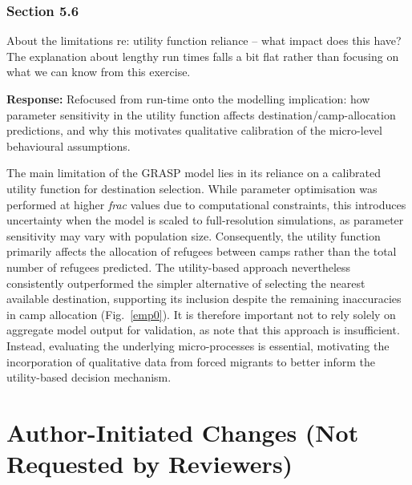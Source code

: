 \documentclass[11pt,a4paper]{article}
\begin{document}
\subsubsection*{Section 5.6}

\begin{reviewbox}
About the limitations re: utility function reliance -- what impact does this have? The explanation about lengthy run times falls a bit flat rather than focusing on what we can know from this exercise.
\end{reviewbox}

\textbf{Response:} Refocused from run-time onto the modelling implication: how parameter sensitivity in the utility
function affects destination/camp-allocation predictions, and why this motivates qualitative calibration of the
micro-level behavioural assumptions.

\vspace{0.3cm}
\begin{updatebox}
The main limitation of the GRASP model lies in its reliance on a calibrated utility function for destination selection.
While parameter optimisation was performed at higher \textit{frac} values due to computational constraints, this introduces
uncertainty when the model is scaled to full-resolution simulations, as parameter sensitivity may vary with population size.
Consequently, the utility function primarily affects the allocation of refugees between camps rather than the total number
of refugees predicted. The utility-based approach nevertheless consistently outperformed the simpler alternative of selecting
the nearest available destination, supporting its inclusion despite the remaining inaccuracies in camp allocation
(Fig.~\ref{emp0}). It is therefore important not to rely solely on aggregate model output for validation, as \citet{He-In}
note that this approach is insufficient. Instead, evaluating the underlying micro-processes is essential, motivating the
incorporation of qualitative data from forced migrants to better inform the utility-based decision mechanism.
\end{updatebox}

\newpage
\section*{Author-Initiated Changes (Not Requested by Reviewers)}
\label{sec:author}
\end{document}
